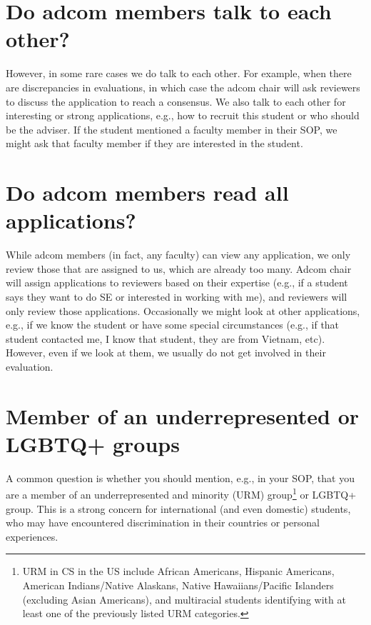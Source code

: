 \documentclass[oneside,11pt,dvipsnames]{book}
\begin{document}
\section{Do adcom members talk to each other?}\label{sec:adcom-discuss}


However, in some rare cases we do talk to each other.  For example, when there are discrepancies in evaluations, in which case the adcom chair will ask reviewers to discuss the application to reach a consensus.  We also talk to each other for interesting or strong applications, e.g., how to recruit this student or who should be the adviser. 
If the student mentioned a faculty member in their SOP, we might ask that faculty member if they are interested in the student. 



\section{Do adcom members read all applications?}\label{sec:read-all}

While adcom members (in fact, any faculty) can view any application, we only review those that are assigned to us, which are already too many. Adcom chair will assign applications to reviewers based on their expertise (e.g., if a student says they want to do SE or interested in working with me), and reviewers will only review those applications. Occasionally we might look at other applications, e.g., if we know the student or have some special circumstances (e.g., if that student contacted me, I know that student, they are from Vietnam, etc). However, even if we look at them, we usually do not get involved in their evaluation.

\section{Member of an underrepresented or LGBTQ+ groups}\label{sec:urm}

A common question is whether you should mention, e.g., in your SOP, that you are a member of an underrepresented and minority (URM) group\footnote{URM in CS in the US include African Americans, Hispanic Americans, American Indians/Native Alaskans, Native Hawaiians/Pacific Islanders (excluding Asian Americans), and multiracial students identifying with at least one of the previously listed URM categories.} or LGBTQ+ group.
This is a strong concern for international (and even domestic) students, who may have encountered discrimination in their countries or personal experiences.
\end{document}
